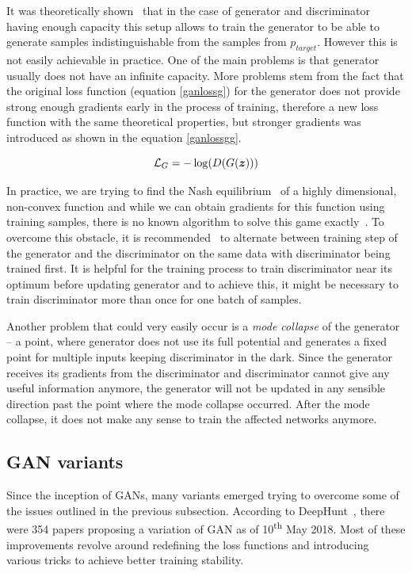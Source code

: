 It was theoretically shown~\cite{origgan} that in the case of generator and discriminator having enough capacity this setup allows to train the generator to be able to generate samples indistinguishable from the samples from $p_{target}$. However this is not easily achievable in practice. One of the main problems is that generator usually does not have an infinite capacity. More problems stem from the fact that the original loss function (equation \ref{ganlossg}) for the generator does not provide strong enough gradients early in the process of training, therefore a new loss function with the same theoretical properties, but stronger gradients was introduced as shown in the equation \ref{ganlossgg}.

\begin{equation}
\mathcal{L}_G = -\log(D(G(\bm{z})))
\label{ganlossgg}
\end{equation}

In practice, we are trying to find the Nash equilibrium~\cite{nash} of a highly dimensional, non-convex function and while we can obtain gradients for this function using training samples, there is no known algorithm to solve this game exactly~\cite{improvedgan}. To overcome this obstacle, it is recommended~\cite{origgan} to alternate between training step of the generator and the discriminator on the same data with discriminator being trained first. It is helpful for the training process to train discriminator near its optimum before updating generator and to achieve this, it might be necessary to train discriminator more than once for one batch of samples.

Another problem that could very easily occur is a {\em mode collapse} of the generator -- a point, where generator does not use its full potential and generates a fixed point for multiple inputs keeping discriminator in the dark. Since the generator receives its gradients from the discriminator and discriminator cannot give any useful information anymore, the generator will not be updated in any sensible direction past the point where the mode collapse occurred. After the mode collapse, it does not make any sense to train the affected networks anymore.

\subsection{GAN variants}

Since the inception of GANs, many variants emerged trying to overcome some of the issues outlined in the previous subsection. According to DeepHunt~\cite{deephunt}, there were 354 papers proposing a variation of GAN as of 10\textsuperscript{th} May 2018. Most of these improvements revolve around redefining the loss functions and introducing various tricks to achieve better training stability.


